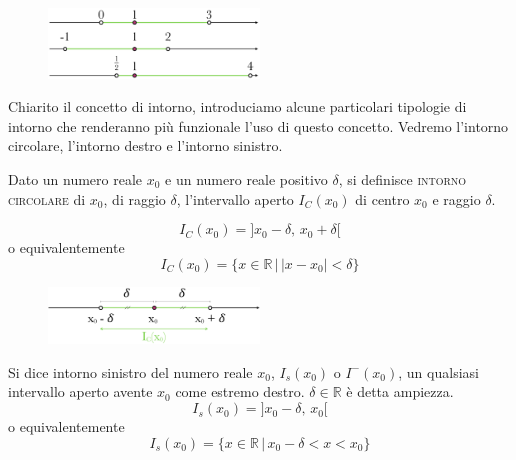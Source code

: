 \begin{figure}[htpb!]
\centering
\includegraphics[width=0.5\textwidth]{img/top_7.png}%
  \end{figure}
  
Chiarito il concetto di intorno, introduciamo alcune particolari tipologie di 
intorno che renderanno più funzionale l'uso di questo concetto. Vedremo 
l'intorno circolare, l'intorno destro e l'intorno sinistro.\\

\begin{definizione}
  Dato un numero reale \(x_0\) e un numero reale positivo \(\delta\), si 
definisce \textsc{intorno circolare} di \(x_0\), di raggio \(\delta\), 
l'intervallo aperto \(I_C(x_0)\) di centro \(x_0\) e raggio \(\delta\).\\
\end{definizione}

\begin{equation}
  I_C(x_0)=]x_0-\delta,\,x_0+\delta[
\end{equation}
o equivalentemente
 \begin{equation}
  I_C(x_0)=\{x\in \mathbb{R}\,\vert\,\vert x-x_0\vert<\delta\}
\end{equation}

\begin{figure}[htpb!]
  \centering
  \includegraphics[width=0.5\textwidth]{img/top_2.png}%
\end{figure}


\begin{definizione}
  Si dice intorno sinistro del numero reale \(x_0\), \(I_s(x_0)\) o 
\(I^-(x_0)\), un qualsiasi intervallo aperto avente \(x_0\) come estremo destro. 
\(\delta\in\mathbb{R}\) è detta ampiezza.\\
\begin{equation}
  I_s(x_0)=]x_0-\delta,\,x_0[
\end{equation}
o equivalentemente
\begin{equation}
  I_s(x_0)=\{x\in \mathbb{R}\,\vert\, x_0-\delta < x<x_0\}
\end{equation}
\end{definizione}

